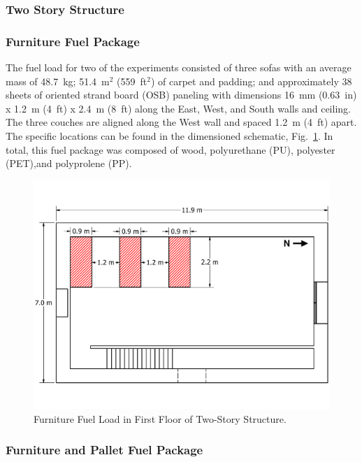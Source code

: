 \documentclass[12pt,oneside]{book}
\begin{document}
\subsubsection*{Two Story Structure}
\label{sec:suppresion_two}

\subsubsection{Furniture Fuel Package}
\label{sec:fire_suppression_furniture_fuel_2}

The fuel load for two of the experiments consisted of three sofas with an average mass of 48.7~kg; 51.4~m$^2$ (559~ft$^2$) of carpet and padding; and approximately 38 sheets of oriented strand board (OSB) paneling with dimensions 16~mm (0.63~in) x 1.2~m (4~ft) x 2.4~m (8~ft) along the East, West, and South walls and ceiling. The three couches are aligned along the West wall and spaced 1.2~m (4~ft) apart. The specific locations can be found in the dimensioned schematic, Fig.~\ref{fig:furniture_2story}. In total, this fuel package was composed of wood, polyurethane (PU), polyester (PET),and polyprolene (PP).

\begin{figure}[!ht]
	\includegraphics[width=\columnwidth]{../../DelCo_2014_2015/Drawings/PDFs/CAFS/West_Structure_1st_Floor_Furniture_Only}
	\caption{Furniture Fuel Load in First Floor of Two-Story Structure.}
	\label{fig:furniture_2story}
\end{figure}

\subsubsection{Furniture and Pallet Fuel Package}
\label{sec:fire_suppression_combo_fuel_2}
\end{document}
